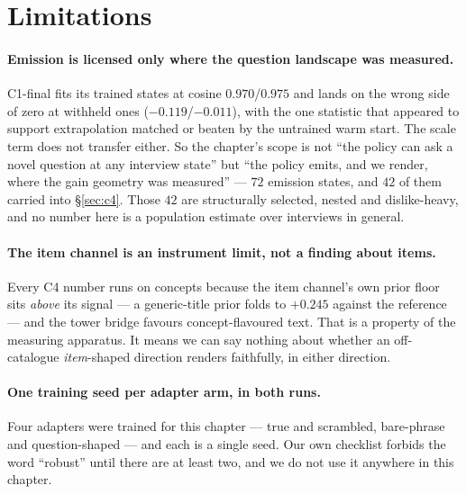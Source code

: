 \documentclass[11pt]{article}
\begin{document}
\section{Limitations}
\label{sec:limitations}

\paragraph{Emission is licensed only where the question landscape was measured.} C1-final fits its
trained states at cosine $0.970$/$0.975$ and lands on the wrong side of zero at withheld ones
($-0.119$/$-0.011$), with the one statistic that appeared to support extrapolation matched or beaten
by the untrained warm start. The scale term does not transfer either. So the chapter's scope is not
``the policy can ask a novel question at any interview state'' but ``the policy emits, and we render,
where the gain geometry was measured'' --- $72$ emission states, and $42$ of them carried into
\S\ref{sec:c4}. Those $42$ are structurally selected, nested and dislike-heavy, and no number here is
a population estimate over interviews in general.

\paragraph{The item channel is an instrument limit, not a finding about items.} Every C4 number runs
on concepts because the item channel's own prior floor sits \emph{above} its signal --- a
generic-title prior folds to $+0.245$ against the reference --- and the tower bridge favours
concept-flavoured text. That is a property of the measuring apparatus. It means we can say nothing
about whether an off-catalogue \emph{item}-shaped direction renders faithfully, in either direction.

\paragraph{One training seed per adapter arm, in both runs.} Four adapters were trained for this
chapter --- true and scrambled, bare-phrase and question-shaped --- and each is a single seed. Our own
checklist forbids the word ``robust'' until there are at least two, and we do not use it anywhere in
this chapter.
\end{document}
